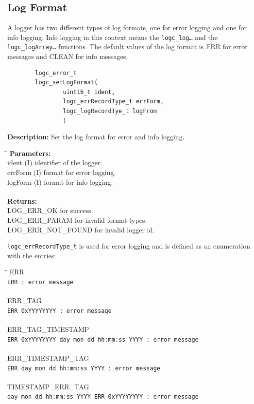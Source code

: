\documentclass[a4paper, titlepage, 11pt]{article}
\begin{document}
\subsection{Log Format}
A logger has two different types of log formats, one for error logging and one
for info logging. Info logging in this context means the \small\verb+logc_log…+
\normalsize and the \small\verb+logc_logArray…+ \normalsize functions. The default values of the log format is ERR for error messages and CLEAN for info messages.
\small
\begin{verbatim}
        logc_error_t
        logc_setLogFormat(
                uint16_t ident,
                logc_errRecordType_t errForm,
                logc_logRecordTye_t logFrom
                )
\end{verbatim}
\normalsize
\textbf{Description:} Set the log format for error and info logging.
\begin{tabbing}
\hspace*{1cm}\=\hspace*{2cm}\=\hspace*{0,6cm}\= \kill
\textbf{Parameters:} \\
\> ident \> (I) identifier of the logger. \\
\> errForm \> (I) format for error logging. \\
\> logForm \> (I) format for info logging. \\ \\
\textbf{Returns:} \\
\> LOG\_ERR\_OK for success. \\
\> LOG\_ERR\_PARAM for invalid format types. \\
\> LOG\_ERR\_NOT\_FOUND for invalid logger id. \\
\end{tabbing}
\small\verb+logc_errRecordType_t+ \normalsize is used for error logging and is defined as an enumeration with the entries:
\begin{tabbing}
\hspace*{1cm}\=\hspace*{2cm}\=\hspace*{0,6cm}\= \kill
\> ERR \\
\> \small\verb+ERR : error message+ \\ \\
\> ERR\_TAG \\
\> \small\verb+ERR 0xYYYYYYYY : error message+ \\ \\
\> ERR\_TAG\_TIMESTAMP \\
\> \small\verb+ERR 0xYYYYYYYY day mon dd hh:mm:ss YYYY : error message+ \\ \\
\> ERR\_TIMESTAMP\_TAG \\
\> \small\verb+ERR day mon dd hh:mm:ss YYYY : error message+ \\ \\
\> TIMESTAMP\_ERR\_TAG \\
\> \small\verb+day mon dd hh:mm:ss YYYY ERR 0xYYYYYYYY : error message+ \\
\end{tabbing}
\end{document}
